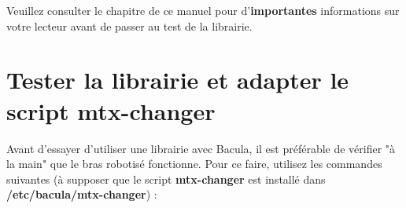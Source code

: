 Veuillez consulter le chapitre 
 de ce manuel pour d'{\bf importantes} 
informations sur votre lecteur avant de passer au test de la librairie.
\label{AutochangerTesting}

\section{Tester la librairie et adapter le script mtx-changer}

Avant d'essayer d'utiliser une librairie avec Bacula, il est pr\'ef\'erable de v\'erifier 
"\`a la main" que le bras robotis\'e fonctionne. Pour ce faire, utilisez les commandes 
suivantes (\`a supposer que le script {\bf mtx-changer} est install\'e dans 
{\bf /etc/bacula/mtx-changer}) :


